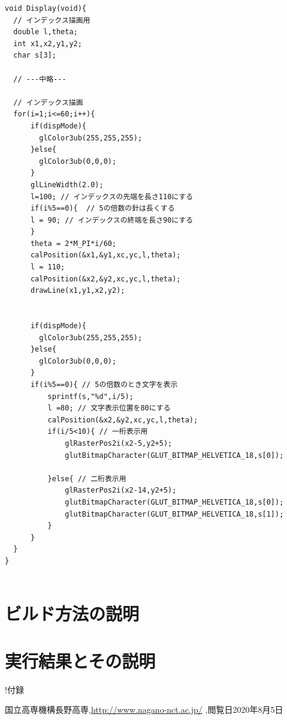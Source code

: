 \documentclass[a4j]{jarticle}
\begin{document}
    \begin{lstlisting}[basicstyle=\ttfamily\footnotesize, frame=single,label=indexstr,caption=インデックスと文字盤の実装]
void Display(void){
  // インデックス描画用
  double l,theta; 
  int x1,x2,y1,y2;
  char s[3];

  // ---中略---

  // インデックス描画
  for(i=1;i<=60;i++){
      if(dispMode){
        glColor3ub(255,255,255);
      }else{
        glColor3ub(0,0,0);
      }
      glLineWidth(2.0);
      l=100; // インデックスの先端を長さ110にする
      if(i%5==0){  // 5の倍数の針は長くする
      l = 90; // インデックスの終端を長さ90にする
      }
      theta = 2*M_PI*i/60;
      calPosition(&x1,&y1,xc,yc,l,theta);
      l = 110;
      calPosition(&x2,&y2,xc,yc,l,theta);
      drawLine(x1,y1,x2,y2);


      if(dispMode){
        glColor3ub(255,255,255);
      }else{
        glColor3ub(0,0,0);
      }
      if(i%5==0){ // 5の倍数のとき文字を表示
          sprintf(s,"%d",i/5);
          l =80; // 文字表示位置を80にする
          calPosition(&x2,&y2,xc,yc,l,theta);
          if(i/5<10){ // 一桁表示用
              glRasterPos2i(x2-5,y2+5);
              glutBitmapCharacter(GLUT_BITMAP_HELVETICA_18,s[0]);

          }else{ // 二桁表示用
              glRasterPos2i(x2-14,y2+5);
              glutBitmapCharacter(GLUT_BITMAP_HELVETICA_18,s[0]);
              glutBitmapCharacter(GLUT_BITMAP_HELVETICA_18,s[1]);
          }
      }
  }
}


    \end{lstlisting}

    \section{ビルド方法の説明}
    \section{実行結果とその説明}

    !付録
        \begin{thebibliography}{9}
            国立高専機構長野高専,\url{http://www.nagano-nct.ac.jp/} ,閲覧日2020年8月5日
          \end{thebibliography}
\end{document}
